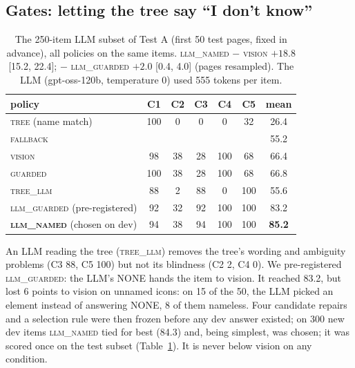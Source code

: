 \documentclass[11pt]{article}
\newcommand{\tree}{\textsc{tree}}
\newcommand{\vis}{\textsc{vision}}
\newcommand{\fb}{\textsc{fallback}}
\begin{document}
\subsection{Gates: letting the tree say ``I don't know''}
\label{sec:gates}

\begin{table}[t]
\centering\small
\begin{tabular}{lcccccc}
\toprule
policy & C1 & C2 & C3 & C4 & C5 & mean \\
\midrule
\tree{} (name match) & 100 & 0 & 0 & 0 & 32 & 26.4 \\
\fb{} & & & & & & 55.2 \\
\vis & 98 & 38 & 28 & 100 & 68 & 66.4 \\
\textsc{guarded} & 100 & 38 & 28 & 100 & 68 & 66.8 \\
\textsc{tree\_llm} & 88 & 2 & 88 & 0 & 100 & 55.6 \\
\textsc{llm\_guarded} (pre-registered) & 92 & 32 & 92 & 100 & 100 & 83.2 \\
\textbf{\textsc{llm\_named}} (chosen on dev) & 94 & 38 & 94 & 100 & 100 & \textbf{85.2} \\
\bottomrule
\end{tabular}
\caption{The 250-item LLM subset of Test A (first 50 test pages, fixed in advance), all policies on the
same items. \textsc{llm\_named} $-$ \vis{} $+18.8$ [15.2, 22.4]; $-$ \textsc{llm\_guarded} $+2.0$
[0.4, 4.0] (pages resampled). The LLM (gpt-oss-120b, temperature 0) used 555 tokens per item.}
\label{tab:gates}
\end{table}

An LLM reading the tree (\textsc{tree\_llm}) removes the tree's wording and ambiguity problems (C3 88, C5
100) but not its blindness (C2 2, C4 0). We pre-registered \textsc{llm\_guarded}: the LLM's NONE hands the
item to vision. It reached 83.2, but lost 6 points to vision on unnamed icons: on 15 of the 50, the LLM picked an
element instead of answering NONE, 8 of them nameless. Four candidate repairs and a selection rule were then
frozen before any dev answer existed; on 300 new dev items \textsc{llm\_named} tied for best (84.3) and,
being simplest, was chosen; it was scored once on the test subset (Table~\ref{tab:gates}). It is never below
vision on any condition.
\end{document}
